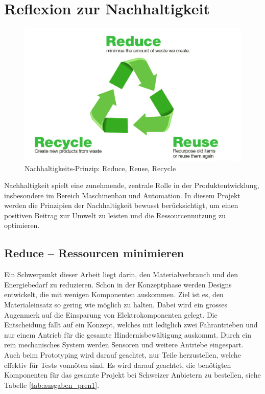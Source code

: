 \documentclass[../main.tex]{subfiles}
\begin{document}
\newpage
\section{Reflexion zur Nachhaltigkeit}

\begin{figure}[H] %
    \centering
        \includegraphics[width=0.7\linewidth]{img/nachhaltigkeit/3R-reduce-reuse-recycle.jpg}
        \caption[Nachhaltigkeits-Prinzip: Reduce, Reuse, Recycle]{Nachhaltigkeits-Prinzip: Reduce, Reuse, Recycle \footnotemark}
        
        \label{fig:3R}
    \end{figure} 


Nachhaltigkeit spielt eine zunehmende, zentrale Rolle in der Produktentwicklung, insbesondere im Bereich Maschinenbau und Automation. In diesem Projekt werden die Prinzipien der Nachhaltigkeit bewusst berücksichtigt, um einen positiven Beitrag zur Umwelt zu leisten und die Ressourcennutzung zu optimieren.

\subsection{Reduce – Ressourcen minimieren}

Ein Schwerpunkt dieser Arbeit liegt darin, den Materialverbrauch und den Energiebedarf zu reduzieren. Schon in der Konzeptphase werden Designs entwickelt, die mit wenigen Komponenten auskommen. Ziel ist es, den Materialeinsatz so gering wie möglich zu halten. Dabei wird ein grosses Augenmerk auf die Einsparung von Elektrokomponenten gelegt. Die Entscheidung fällt auf ein Konzept, welches mit lediglich zwei Fahrantrieben und nur einem Antrieb für die gesamte Hindernisbewältigung auskommt. Durch ein rein mechanisches System werden Sensoren und weitere Antriebe eingespart. Auch beim Prototyping wird darauf geachtet, nur Teile herzustellen, welche effektiv für Tests vonnöten sind. Es wird darauf geachtet, die benötigten Komponenten für das gesamte Projekt bei Schweizer Anbietern zu bestellen, siehe Tabelle \ref{tab:ausgaben_pren1}.
\end{document}
